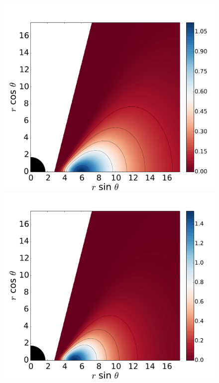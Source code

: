 \documentclass[twocolumn,aps,showpacs,showkeys,prd,superscriptaddress,byrevtex, amsmath]{revtex4-1}
\begin{document}
\begin{figure}
\includegraphics[scale=0.14]{figures/fig9_05_1.pdf}
\hspace{-0.2cm}
\includegraphics[scale=0.14]{figures/fig9_05__10.pdf}
\\

\end{figure}
\end{document}
